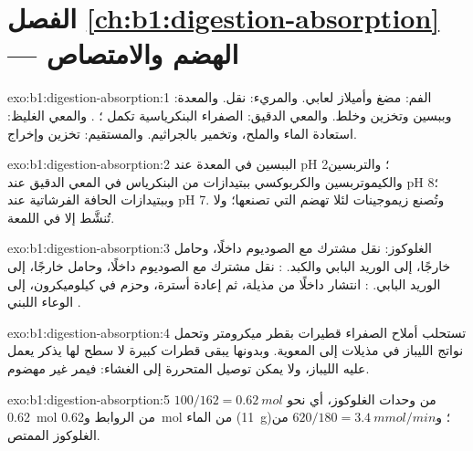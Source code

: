\section*{الفصل \ref{ch:b1:digestion-absorption} --- الهضم والامتصاص}

\begin{solution}{exo:b1:digestion-absorption:1}
الفم: مضغ وأميلاز لعابي. والمريء: نقل. والمعدة:  وببسين وتخزين
وخلط. والمعي الدقيق: الصفراء  البنكرياسية تكمل ؛
. والمعي الغليظ: استعادة الماء والملح، وتخمير بالجراثيم.
والمستقيم: تخزين وإخراج.
\end{solution}

\begin{solution}{exo:b1:digestion-absorption:2}
الببسين في المعدة عند pH 2؛ والتربسين والكيموتربسين
والكربوكسي ببتيدازات من البنكرياس في المعي الدقيق عند pH 8؛
وببتيدازات الحافة الفرشاتية عند pH 7. وتُصنع زيموجينات لئلا تهضم
 التي تصنعها؛ ولا تُنشَّط إلا في اللمعة.
\end{solution}

\begin{solution}{exo:b1:digestion-absorption:3}
الغلوكوز: نقل مشترك مع الصوديوم داخلًا، وحامل خارجًا، إلى الوريد
البابي والكبد. : نقل مشترك مع الصوديوم داخلًا، وحامل
خارجًا، إلى الوريد البابي. : انتشار داخلًا من مذيلة،
ثم إعادة أسترة، وحزم في كيلوميكرون،  إلى الوعاء اللبني
.
\end{solution}

\begin{solution}{exo:b1:digestion-absorption:4}
تستحلب أملاح الصفراء  قطيرات بقطر ميكرومتر وتحمل نواتج
الليباز في مذيلات إلى  المعوية. وبدونها يبقى  قطرات
كبيرة لا سطح لها يذكر يعمل عليه الليباز، ولا يمكن توصيل  المتحررة إلى الغشاء: فيمر  غير مهضوم.
\end{solution}

\begin{solution}{exo:b1:digestion-absorption:5}
$100/162 = \qty{0.62}{mol}$ من وحدات الغلوكوز، أي نحو
\qty{0.62}{mol} من الروابط و\qty{0.62}{mol} من الماء (\qty{11}{g})؛
و$620/180 = \qty{3.4}{mmol/min}$ من الغلوكوز الممتص.
\end{solution}

